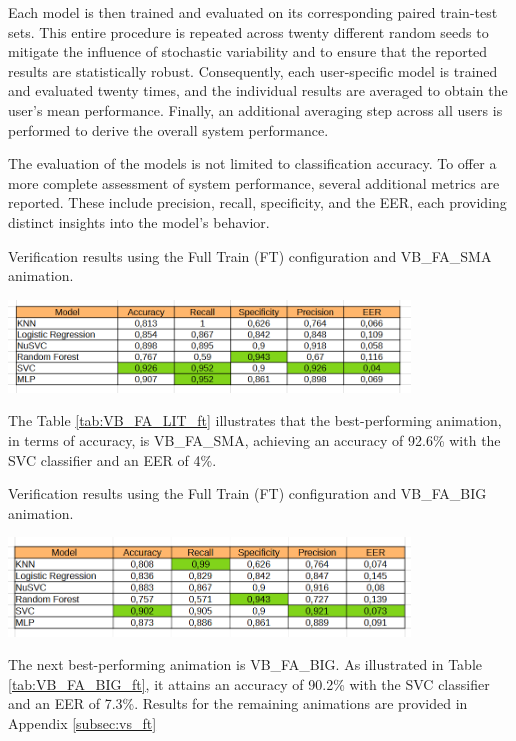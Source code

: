 \documentclass[12pt]{report}
\begin{document}
Each model is then trained and evaluated on its corresponding paired train-test sets.
This entire procedure is repeated across twenty different random seeds to mitigate the influence of stochastic variability and to ensure that the reported results are statistically robust. 
Consequently, each user-specific model is trained and evaluated twenty times, and the individual results are averaged to obtain the user's mean performance. 
Finally, an additional averaging step across all users is performed to derive the overall system performance.

The evaluation of the models is not limited to classification accuracy. 
To offer a more complete assessment of system performance, several additional metrics are reported. 
These include precision, recall, specificity, and the EER, each providing distinct insights into the model's behavior.

\begin{table}[ht]
    \centering
    \caption{Verification results using the Full Train (FT) configuration and VB\_FA\_SMA animation.}
    \includegraphics[width=0.8\textwidth]{Images/Results/Verification_single/ft/VB_FA_LIT.png}
    \label{tab:VB_FA_LIT_ft}
\end{table}

The Table \ref{tab:VB_FA_LIT_ft} illustrates that the best-performing animation, in terms of accuracy, is VB\_FA\_SMA, achieving an accuracy of 92.6\% with the SVC classifier and an EER of 4\%.

\begin{table}[ht]
    \centering
    \caption{Verification results using the Full Train (FT) configuration and VB\_FA\_BIG animation.}
    \includegraphics[width=0.8\textwidth]{Images/Results/Verification_single/ft/VB_FA_BIG.png}
    \label{tab:VB_FA_BIG_ft}
\end{table}

The next best-performing animation is VB\_FA\_BIG. 
As illustrated in Table \ref{tab:VB_FA_BIG_ft}, it attains an accuracy of 90.2\% with the SVC classifier and an EER of 7.3\%. 
Results for the remaining animations are provided in Appendix \ref{subsec:vs_ft}
\end{document}
